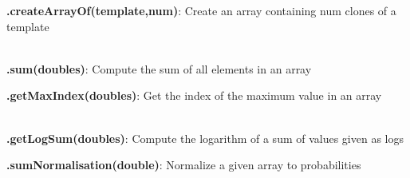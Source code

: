 \documentclass[10pt]{scrartcl}
\newcommand{\entrys}[3]{\item[\emph{static}] {\bfseries {#1#2}}: #3}
\newcommand{\sep}{\\~\vspace{-0.1cm}}
\begin{document}
\begin{flushleft}
\begin{itemize*}
\entrys{\ArrayHandler}{.createArrayOf(template,num)}{Create an array containing num clones of a template}\sep

\entrys{\ToolBox}{.sum(doubles)}{Compute the sum of all elements in an array}

\entrys{\ToolBox}{.getMaxIndex(doubles)}{Get the index of the maximum value in an array}\sep

\entrys{\Normalisation}{.getLogSum(doubles)}{Compute the logarithm of a sum of values given as logs}

\entrys{\Normalisation}{.sumNormalisation(double)}{Normalize a given array to probabilities}

\end{itemize*}

\end{flushleft}
\end{document}
